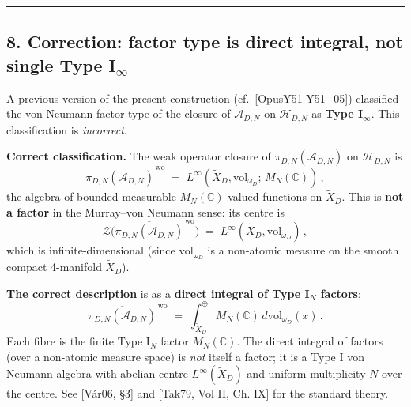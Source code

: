 \documentclass[
  11pt,
  a4paper,
]{amsart}
\begin{document}
\begin{center}\rule{0.5\linewidth}{0.5pt}\end{center}

\hypertarget{correction-factor-type-is-direct-integral-not-single-type-i_infty}{%
\subsection{\texorpdfstring{8. Correction: factor type is direct integral, not single Type I\(_\infty\)}{8. Correction: factor type is direct integral, not single Type I\_\textbackslash infty}}\label{correction-factor-type-is-direct-integral-not-single-type-i_infty}}

A previous version of the present construction (cf.~{[}OpusY51 Y51\_05{]})
classified the von Neumann factor type of the closure of \(\mathcal{A}_{D,N}\) on
\(\mathcal{H}_{D,N}\) as \textbf{Type I\(_\infty\)}. This classification is \emph{incorrect}.

\textbf{Correct classification.} The weak operator closure of
\(\pi_{D,N}(\mathcal{A}_{D,N})\) on \(\mathcal{H}_{D,N}\) is
\begin{equation}\label{eq:closure}
\overline{\pi_{D,N}(\mathcal{A}_{D,N})}^{\,\mathrm{wo}} \;=\; L^\infty(\widetilde{X}_D, \mathrm{vol}_{\omega_D};\, M_N(\mathbb{C}))\,,
\end{equation}
the algebra of bounded measurable \(M_N(\mathbb{C})\)-valued functions on
\(\widetilde{X}_D\). This is \textbf{not a factor} in the Murray--von Neumann sense:
its centre is
\[
\mathcal{Z}\bigl(\overline{\pi_{D,N}(\mathcal{A}_{D,N})}^{\,\mathrm{wo}}\bigr) \;=\; L^\infty(\widetilde{X}_D, \mathrm{vol}_{\omega_D})\,,
\]
which is infinite-dimensional (since \(\mathrm{vol}_{\omega_D}\) is a non-atomic
measure on the smooth compact 4-manifold \(\widetilde{X}_D\)).

\textbf{The correct description} is as a \textbf{direct integral of Type I\(_N\) factors}:
\begin{equation}\label{eq:dir-int}
\overline{\pi_{D,N}(\mathcal{A}_{D,N})}^{\,\mathrm{wo}} \;=\; \int_{\widetilde{X}_D}^{\oplus} M_N(\mathbb{C})\, d\mathrm{vol}_{\omega_D}(x)\,.
\end{equation}
Each fibre is the finite Type I\(_N\) factor \(M_N(\mathbb{C})\). The direct
integral of factors (over a non-atomic measure space) is \emph{not} itself a factor;
it is a Type I von Neumann algebra with abelian centre \(L^\infty(\widetilde{X}_D)\)
and uniform multiplicity \(N\) over the centre. See {[}Vár06, §3{]} and {[}Tak79, Vol II,
Ch. IX{]} for the standard theory.
\end{document}
